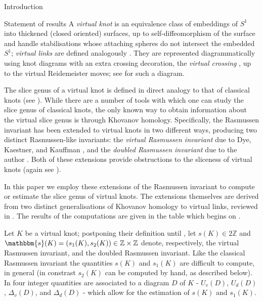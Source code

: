 \documentclass[10pt,oneside]{amsart}
\theoremstyle{definition}
\numberwithin{equation}{section}
\begin{document}
{	\z@{-1.2\linespacing\@plus-.5\linespacing}{.8\linespacing}	{\normalfont\bfseries\Large}}{Introduction}

{		{\normalfont\bfseries\large}}{Statement of results}\label{Subsec:results}
A \emph{virtual knot} is an equivalence class of embeddings of \(S^1\) into thickened (closed oriented) surfaces, up to self-diffeomorphism of the surface and handle stabilisations whose attaching spheres do not intersect the embedded \( S^1 \); \emph{virtual links} are defined analogously \cite{Kauffman1998}. They are represented diagrammatically using knot diagrams with an extra crossing decoration, the \emph{virtual crossing} , up to the virtual Reidemeister moves; see  for such a diagram.

The slice genus of a virtual knot is defined in direct analogy to that of classical knots (see ). While there are a number of tools with which one can study the slice genus of classical knots, the only known way to obtain information about the virtual slice genus is through Khovanov homology. Specifically, the Rasmussen invariant has been extended to virtual knots in two different ways, producing two distinct Rasmussen-like invariants: the \emph{virtual Rasmussen invariant} due to Dye, Kaestner, and Kauffman \cite{Dye2014}, and the \emph{doubled Rasmussen invariant} due to the author \cite{Rushworth2017}. Both of these extensions provide obstructions to the sliceness of virtual knots (again see ).

In this paper we employ these extensions of the Rasmussen invariant to compute or estimate the slice genus of virtual knots. The extensions themselves are derived from two distinct generalisations of Khovanov homology to virtual links, reviewed in . The results of the computations are given in the table which begins on .

Let \( K \) be a virtual knot; postponing their definition until , let \( s( K ) \in 2 \mathbb{Z} \) and \( \mathbbm{s} ( K ) = ( s_1 ( K ), s_2 ( K ) ) \in \mathbb{Z} \times \mathbb{Z} \) denote, respectively, the virtual Rasmussen invariant, and the doubled Rasmussen invariant. Like the classical Rasmussen invariant the quantities \( s ( K ) \) and \( s_1 ( K ) \) are difficult to compute, in general (in constrast \( s_2 ( K ) \) can be computed by hand, as described below). In  four integer quantities are associated to a diagram \( D \) of \( K \) - \( U_v ( D ) \), \( U_d ( D ) \), \( \Delta_v ( D ) \), and \( \Delta_d ( D ) \) - which allow for the estimation of \( s ( K ) \) and \( s_1 ( K ) \).
\end{document}

